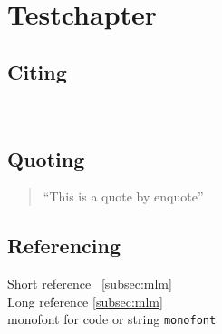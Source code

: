 \documentclass[12pt, a4paper, english]{ttlab-qualify}
\begin{document}
    \chapter{\latex Testchapter}
    \section{Citing}
    ~\cite{GERPARCOR}
    \section{Quoting}
    \begin{quote}
        \enquote{This is a quote by enquote}
    \end{quote}

    \section{Referencing}
    Short reference ~\ref{subsec:mlm}\\
    Long reference \autoref{subsec:mlm}\\
    monofont for code or string \texttt{monofont}

    \appendix
    \printbibliography
\end{document}
